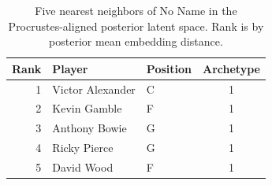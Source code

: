 \begin{table}[htbp]
  \centering\small
  \begin{tabular}{rllc}
    \toprule
    Rank & Player & Position & Archetype \\
    \midrule
    1 & Victor Alexander & C & 1 \\
    2 & Kevin Gamble & F & 1 \\
    3 & Anthony Bowie & G & 1 \\
    4 & Ricky Pierce & G & 1 \\
    5 & David Wood & F & 1 \\
    \bottomrule
  \end{tabular}
  \caption{Five nearest neighbors of No Name in the Procrustes-aligned posterior latent space. Rank is by posterior mean embedding distance.}
  \label{tab:No_Name_neighbors}
\end{table}

